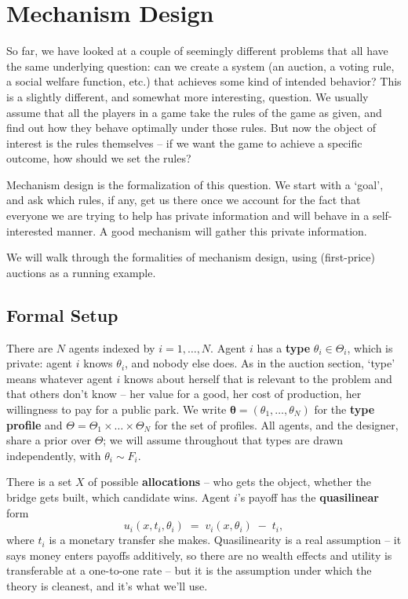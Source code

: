 \documentclass[12pt]{article}
\theoremstyle{definition}
\theoremstyle{remark}
\theoremstyle{plain}                          %
\newcommand{\Th}{\Theta}
\newcommand{\tv}{\boldsymbol{\theta}}
\begin{document}
\newpage


\section{Mechanism Design}
 
So far, we have looked at a couple of seemingly different problems that all have the same underlying question: can we create a system (an auction, a voting rule, a social welfare function, etc.) that achieves some kind of intended behavior? This is a slightly different, and somewhat more interesting, question. We usually assume that all the players in a game take the rules of the game as given, and find out how they behave optimally under those rules. But now the object of interest is the rules themselves -- if we want the game to achieve a specific outcome, how should we set the rules?

Mechanism design is the formalization of this question. We start with a `goal', and ask which rules, if any, get us there once we account for the fact that everyone we are trying to help has private information and will behave in a self-interested manner. A good mechanism will gather this private information.

We will walk through the formalities of mechanism design, using (first-price) auctions as a running example.
 
\subsection{Formal Setup}\label{sec:md-setup}
 
There are $N$ agents indexed by $i=1,\dots,N$. Agent $i$ has a \textbf{type} $\theta_i \in \Th_i$, which is private: agent $i$ knows $\theta_i$, and nobody else does. As in the auction section, `type' means whatever agent $i$ knows about herself that is relevant to the problem and that others don't know -- her value for a good, her cost of production, her willingness to pay for a public park. We write $\tv = (\theta_1,\dots,\theta_N)$ for the \textbf{type profile} and $\Th = \Th_1 \times \dots \times \Th_N$ for the set of profiles. All agents, and the designer, share a prior over $\Th$; we will assume throughout that types are drawn independently, with $\theta_i \sim F_i$.
 
There is a set $X$ of possible \textbf{allocations} -- who gets the object, whether the bridge gets built, which candidate wins. Agent $i$'s payoff has the \textbf{quasilinear} form
\[
    u_i(x,t_i,\theta_i) \;=\; v_i(x,\theta_i) \;-\; t_i,
\]
where $t_i$ is a monetary transfer she makes. Quasilinearity is a real assumption -- it says money enters payoffs additively, so there are no wealth effects and utility is transferable at a one-to-one rate -- but it is the assumption under which the theory is cleanest, and it's what we'll use.
 
\end{document}

